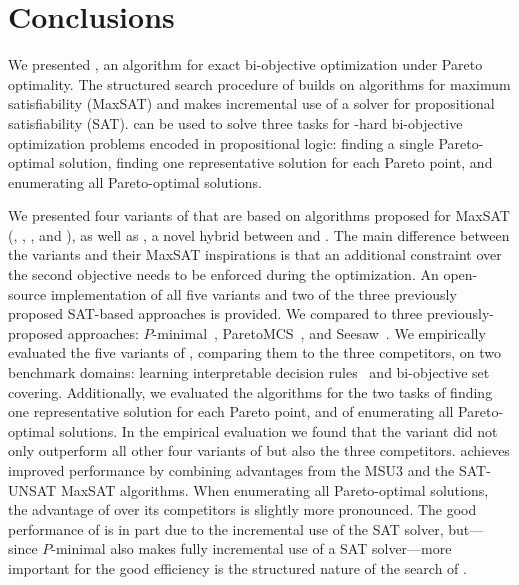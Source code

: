 \chapter{Conclusions\label{chap:conclusion}}

We presented \algname{}, an algorithm for exact bi-objective optimization under Pareto optimality.
The structured search procedure of \algname{} builds on algorithms for maximum satisfiability (MaxSAT) and makes incremental use of a solver for propositional satisfiability (SAT).
\algname{} can be used to solve three tasks for \NP-hard bi-objective optimization problems encoded in propositional logic:
finding a single Pareto-optimal solution, finding one representative solution for each Pareto point, and enumerating all Pareto-optimal solutions.

We presented four variants of \algname{} that are based on algorithms proposed for MaxSAT (\satunsat{}, \unsatsat{}, \msu{}, and \oll{}), as well as \msh{}, a novel hybrid between \msu{} and \satunsat{}.
The main difference between the \algname{} variants and their MaxSAT inspirations is that an additional constraint over the second objective needs to be enforced during the optimization.
An open-source implementation of all five variants and two of the three previously proposed SAT-based approaches is provided.
We compared \algname{} to three previously-proposed approaches:
$P$-minimal~\autocite{DBLP:conf/cp/SohBTB17}, ParetoMCS~\autocite{DBLP:conf/ijcai/Terra-NevesLM18a}, and Seesaw~\autocite{DBLP:conf/cp/JanotaMSM21}.
We empirically evaluated the five variants of \algname{}, comparing them to the three competitors, on two benchmark domains: learning interpretable decision rules~\autocite{DBLP:conf/cp/MaliotovM18} and bi-objective set covering.
Additionally, we evaluated the algorithms for the two tasks of finding one representative solution for each Pareto point, and of enumerating all Pareto-optimal solutions.
In the empirical evaluation we found that the \msh{} variant did not only outperform all other four variants of \algname{} but also the three competitors.
\msh{} achieves improved performance by combining advantages from the MSU3 and the SAT-UNSAT MaxSAT algorithms.
When enumerating all Pareto-optimal solutions, the advantage of \algname{} over its competitors is slightly more pronounced.
The good performance of \algname{} is in part due to the incremental use of the SAT solver, but---since $P$-minimal also makes fully incremental use of a SAT solver---more important for the good efficiency is the structured nature of the search of \algname{}.

